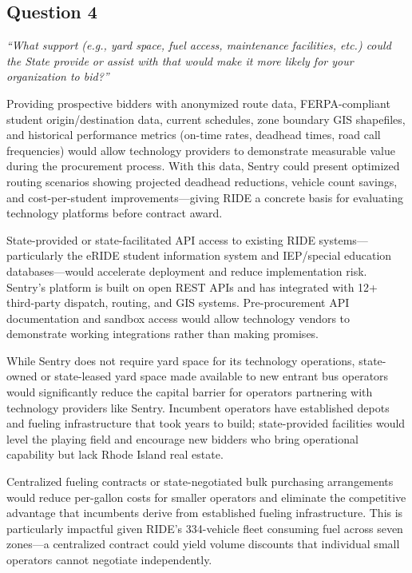 \subsection{Question 4}
\textit{``What support (e.g., yard space, fuel access, maintenance facilities, etc.) could the State provide or assist with that would make it more likely for your organization to bid?''}

\begin{description}[style=nextline, leftmargin=0.5cm]
    \item[\faIcon{database} \textbf{Data Access:}] Providing prospective bidders with anonymized route data, FERPA-compliant student origin/destination data, current schedules, zone boundary GIS shapefiles, and historical performance metrics (on-time rates, deadhead times, road call frequencies) would allow technology providers to demonstrate measurable value during the procurement process. With this data, Sentry could present optimized routing scenarios showing projected deadhead reductions, vehicle count savings, and cost-per-student improvements---giving RIDE a concrete basis for evaluating technology platforms before contract award.

    \item[\faIcon{server} \textbf{Technology Infrastructure:}] State-provided or state-facilitated API access to existing RIDE systems---particularly the eRIDE student information system and IEP/special education databases---would accelerate deployment and reduce implementation risk. Sentry's platform is built on open REST APIs and has integrated with 12+ third-party dispatch, routing, and GIS systems. Pre-procurement API documentation and sandbox access would allow technology vendors to demonstrate working integrations rather than making promises.

    \item[\faIcon{warehouse} \textbf{Yard Space \& Facilities:}] While Sentry does not require yard space for its technology operations, state-owned or state-leased yard space made available to new entrant bus operators would significantly reduce the capital barrier for operators partnering with technology providers like Sentry. Incumbent operators have established depots and fueling infrastructure that took years to build; state-provided facilities would level the playing field and encourage new bidders who bring operational capability but lack Rhode Island real estate.

    \item[\faIcon{gas-pump} \textbf{Fuel Access:}] Centralized fueling contracts or state-negotiated bulk purchasing arrangements would reduce per-gallon costs for smaller operators and eliminate the competitive advantage that incumbents derive from established fueling infrastructure. This is particularly impactful given RIDE's 334-vehicle fleet consuming fuel across seven zones---a centralized contract could yield volume discounts that individual small operators cannot negotiate independently.


\end{description}
